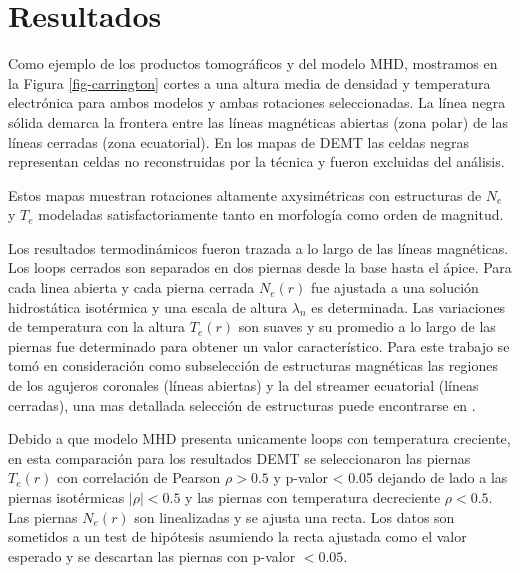 \documentclass[baaa]{baaa}
\begin{document}


\section{Resultados}
Como ejemplo de los productos tomográficos y del modelo MHD, mostramos en la Figura \ref{fig-carrington} cortes a una altura media de densidad y temperatura electrónica para ambos modelos y ambas rotaciones seleccionadas. La línea negra sólida demarca la frontera entre las líneas magnéticas abiertas (zona polar) de las líneas cerradas (zona ecuatorial). En los mapas de DEMT las celdas negras representan celdas no reconstruidas por la técnica y fueron excluidas del análisis.

Estos mapas muestran rotaciones altamente axysimétricas con estructuras de $N_e$ y $T_e$ modeladas satisfactoriamente tanto en morfología como orden de magnitud.

Los resultados termodinámicos fueron trazada a lo largo de las líneas magnéticas. Los loops cerrados son separados en dos piernas desde la base hasta el ápice. Para cada linea abierta y cada pierna cerrada $N_e(r)$ fue ajustada a una solución hidrostática isotérmica y una escala de altura $\lambda_n$ es determinada. Las variaciones de temperatura con la altura $T_e(r)$ son suaves y su promedio a lo largo de las piernas fue determinado para obtener un valor característico. Para este trabajo se tomó en consideración como subselección de estructuras magnéticas las regiones de los agujeros coronales (líneas abiertas) y la del streamer ecuatorial (líneas cerradas), una mas detallada selección de estructuras puede encontrarse en \citet{lloveras_2017}. 

Debido a que modelo MHD presenta unicamente loops con temperatura creciente, en esta comparación para los resultados DEMT se seleccionaron las piernas $T_e(r)$ con correlación de Pearson $\rho > 0.5$ y p-valor < 0.05 dejando de lado a las piernas isotérmicas $\left | \rho \right | < 0.5$ y las piernas con temperatura decreciente $\rho < 0.5$. Las piernas $N_e(r)$ son linealizadas y se ajusta una recta. Los datos son sometidos a un test de hipótesis asumiendo la recta ajustada como el valor esperado y se descartan las piernas con p-valor $<0.05$.
\end{document}
